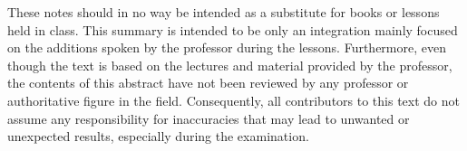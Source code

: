 These notes should in no way be intended as a substitute for books or lessons held in class. This summary is intended to be only an integration mainly focused on the additions spoken by the professor during the lessons.
Furthermore, even though the text is based on the lectures and material provided by the professor, the contents of this abstract have not been reviewed by any professor or authoritative figure in the field.
Consequently, all contributors to this text do not assume any responsibility for inaccuracies that may lead to unwanted or unexpected results, especially during the examination.